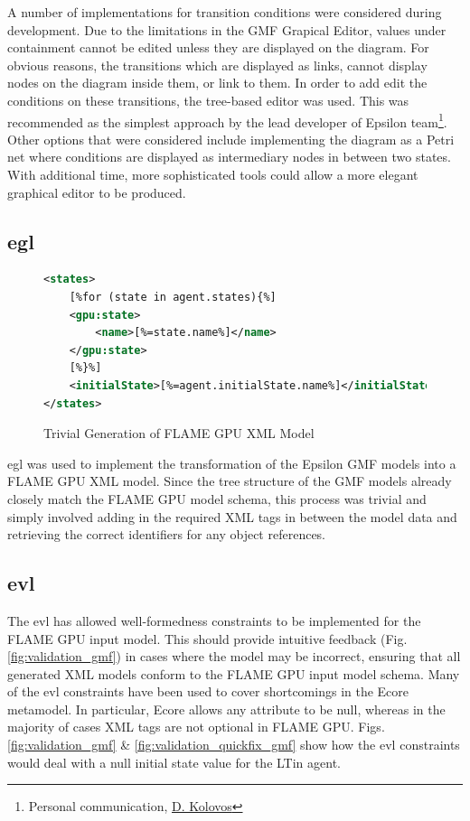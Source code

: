 \documentclass{UoYCSproject}
\begin{document}
A number of implementations for transition conditions were considered during development.
Due to the limitations in the GMF Grapical Editor, values under containment cannot be edited unless they are displayed on the diagram.
For obvious reasons, the transitions which are displayed as links, cannot display nodes on the diagram inside them, or link to them.
In order to add edit the conditions on these transitions, the tree-based editor was used.
This was recommended as the simplest approach by the lead developer of Epsilon team\footnote{Personal communication, \href{https://www-users.cs.york.ac.uk/dkolovos/}{D. Kolovos}}.
Other options that were considered include implementing the diagram as a Petri net where conditions are displayed as intermediary nodes in between two states.
With additional time, more sophisticated tools could allow a more elegant graphical editor to be produced.

\subsection{\acrfull{egl}}
\begin{figure}
\centering
\begin{lstlisting}[language=XML, basicstyle=\tiny]
<states>
    [%for (state in agent.states){%]
    <gpu:state>
        <name>[%=state.name%]</name>
    </gpu:state>
    [%}%]
    <initialState>[%=agent.initialState.name%]</initialState>
</states>
\end{lstlisting}
\caption{Trivial Generation of \gls{FLAME GPU} XML Model}
\label{fig:egl_example}
\end{figure}

\gls{egl} was used to implement the transformation of the Epsilon GMF models into a \gls{FLAME GPU} XML model.
Since the tree structure of the GMF models already closely match the \gls{FLAME GPU} model schema, this process was trivial and simply involved adding in the required XML tags in between the model data and retrieving the correct identifiers for any object references.

\subsection{\acrfull{evl}}
The \gls{evl} has allowed well-formedness constraints to be implemented for the \gls{FLAME GPU} input model.
This should provide intuitive feedback (Fig. \ref{fig:validation_gmf}) in cases where the model may be incorrect, ensuring that all generated XML models conform to the \gls{FLAME GPU} input model schema.
Many of the \gls{evl} constraints have been used to cover shortcomings in the Ecore metamodel.
In particular, Ecore allows any attribute to be null, whereas in the majority of cases XML tags are not optional in \gls{FLAME GPU}.
Figs. \ref{fig:validation_gmf} \& \ref{fig:validation_quickfix_gmf} show how the \gls{evl} constraints would deal with a null initial state value for the \gls{LTin} agent.
\end{document}
